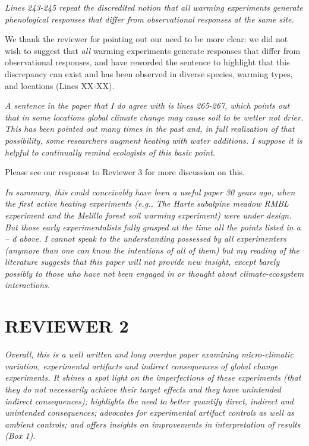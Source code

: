 \documentclass[11pt,a4paper]{letter}
\begin{document}
\emph {Lines 243-245 repeat the discredited notion that all warming experiments generate phenological responses that differ from observational responses at the same site. } 
\par We thank the reviewer for pointing out our need to be more clear: we did not wish to suggest that \emph{all} warming experiments generate responses that differ from observational responses, and have reworded the sentence to highlight that this discrepancy can exist and has been observed in diverse species, warming types, and locations (Lines XX-XX).

\emph{A sentence in the paper that I do agree with is lines 265-267, which points out that in some locations global climate change may cause soil to be wetter not drier.  This has been pointed out many times in the past and, in full realization of that possibility, some researchers augment heating with water additions.  I suppose it is helpful to continually remind ecologists of this basic point.}
\par Please see our response to Reviewer 3 for more discussion on this.

\emph{In summary, this could conceivably have been a useful paper 30 years ago, when the first active heating experiments (e.g., The Harte subalpine meadow RMBL experiment and the Melillo forest soil warming experiment) were under design.  But those early experimentalists fully grasped at the time all the points listed in a -- d above.  I cannot speak to the understanding possessed by all experimenters (anymore than one can know the intentions of all of them) but my reading of the literature suggests that this paper will not provide new insight, except barely possibly to those who have not been engaged in or thought about climate-ecosystem interactions.} 


\section {REVIEWER 2}
\emph{Overall, this is a well written and long overdue paper examining micro-climatic variation, experimental artifacts and indirect consequences of global change experiments.  It shines a spot light on the imperfections of these experiments (that they do not necessarily achieve their target effects and they have unintended indirect consequences); highlights the need to better quantify direct, indirect and unintended consequences; advocates for experimental artifact controls as well as ambient controls;  and offers insights on improvements in interpretation of results (Box 1).}
\end{document}
